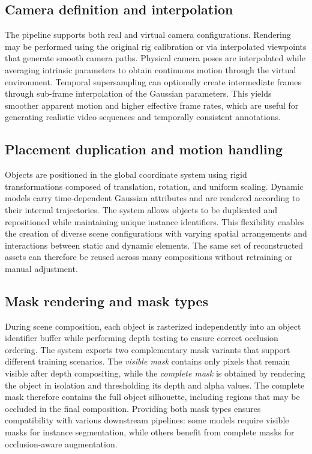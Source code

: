 \subsection{Camera definition and interpolation}
The pipeline supports both real and virtual camera configurations. Rendering may be performed using the original rig calibration or via interpolated viewpoints that generate smooth camera paths. Physical camera poses are interpolated while averaging intrinsic parameters to obtain continuous motion through the virtual environment. Temporal supersampling can optionally create intermediate frames through sub-frame interpolation of the Gaussian parameters. This yields smoother apparent motion and higher effective frame rates, which are useful for generating realistic video sequences and temporally consistent annotations.

\subsection{Placement duplication and motion handling}
Objects are positioned in the global coordinate system using rigid transformations composed of translation, rotation, and uniform scaling. Dynamic models carry time-dependent Gaussian attributes and are rendered according to their internal trajectories. The system allows objects to be duplicated and repositioned while maintaining unique instance identifiers. This flexibility enables the creation of diverse scene configurations with varying spatial arrangements and interactions between static and dynamic elements. The same set of reconstructed assets can therefore be reused across many compositions without retraining or manual adjustment.

\subsection{Mask rendering and mask types}
During scene composition, each object is rasterized independently into an object identifier buffer while performing depth testing to ensure correct occlusion ordering. The system exports two complementary mask variants that support different training scenarios. The \emph{visible mask} contains only pixels that remain visible after depth compositing, while the \emph{complete mask} is obtained by rendering the object in isolation and thresholding its depth and alpha values. The complete mask therefore contains the full object silhouette, including regions that may be occluded in the final composition. Providing both mask types ensures compatibility with various downstream pipelines: some models require visible masks for instance segmentation, while others benefit from complete masks for occlusion-aware augmentation.

